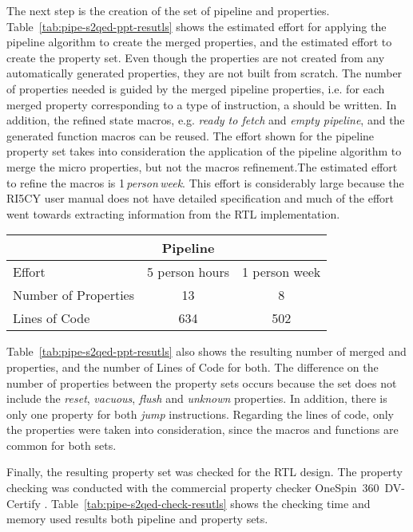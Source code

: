 The next step is the creation of the set of pipeline and \SSQED{} properties. Table~\ref{tab:pipe-s2qed-ppt-resutls} shows the estimated effort for applying the pipeline algorithm to create the merged properties, and the estimated effort to create the \SSQED{} property set. Even though the \SSQED{} properties are not created from any automatically generated properties, they are not built from scratch. The number of properties needed is guided by the merged pipeline properties, i.e. for each merged property corresponding to a type of instruction, a \SSQED{} should be written. In addition, the refined state macros, e.g. \textit{ready to fetch} and \textit{empty pipeline}, and the generated function macros can be reused. The effort shown for the pipeline property set takes into consideration the application of the pipeline algorithm to merge the micro properties, but not the macros refinement.The estimated effort to refine the macros is 1\,\textit{person\,week}. This effort is considerably large because the RI5CY user manual \cite{manual-ri5cy} does not have detailed specification and much of the effort went towards extracting information from the RTL implementation.

\begin{table*}[htb!] 
	\centering 
	\caption{Results comparison between the Pipeline and \SSQED{} properties sets.} 
	\label{tab:pipe-s2qed-ppt-resutls}
	\begin{tabular}{p{5cm} c c} 
		  &  \textbf{Pipeline} & \textbf{\SSQED{}} \\     
		\hline	
		Effort  &  5 person hours & 1 person week \\
		Number of Properties  &  13 & 8 \\
		Lines of Code  &  634 & 502 \\
	\end{tabular} 
\end{table*}

Table~\ref{tab:pipe-s2qed-ppt-resutls} also shows the resulting number of merged and \SSQED{} properties, and the number of Lines of Code for both. The difference on the number of properties between the property sets occurs because the \SSQED{} set does not include the \textit{reset}, \textit{vacuous}, \textit{flush} and \textit{unknown} properties. In addition, there is only one \SSQED{} property for both \textit{jump} instructions. Regarding the lines of code, only the properties were taken into consideration, since the macros and functions are common for both sets.

Finally, the resulting property set was checked for the RTL design. The property checking was conducted with the commercial property checker OneSpin~360~DV-Certify \texttrademark{}. Table~\ref{tab:pipe-s2qed-check-resutls} shows the checking time and memory used results both pipeline and \SSQED{} property sets.

